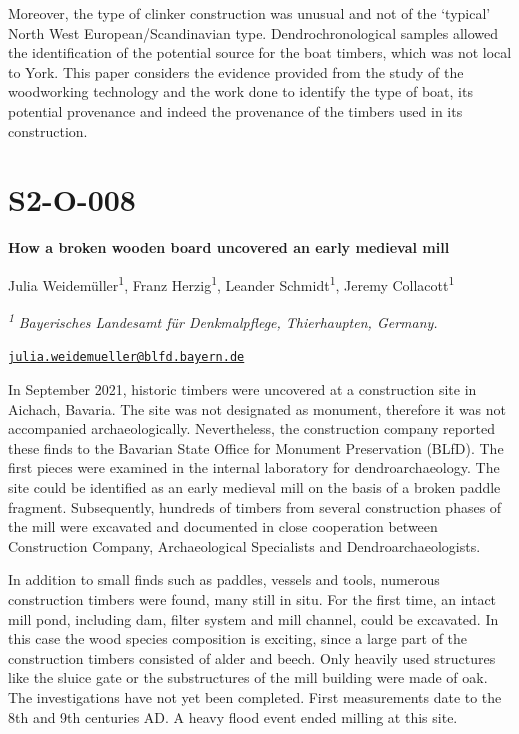 \documentclass[
]{book}
\begin{document}
Moreover, the type of clinker construction was unusual and not of the `typical' North West European/Scandinavian type. Dendrochronological samples allowed the identification of the potential source for the boat timbers, which was not local to York. This paper considers the evidence provided from the study of the woodworking technology and the work done to identify the type of boat, its potential provenance and indeed the provenance of the timbers used in its construction.

\hypertarget{s2-o-008}{%
\section*{S2-O-008}\label{s2-o-008}}

\textbf{How a broken wooden board uncovered an early medieval mill}

Julia Weidemüller\textsuperscript{1}, Franz Herzig\textsuperscript{1}, Leander Schmidt\textsuperscript{1}, Jeremy Collacott\textsuperscript{1}

\textsuperscript{\emph{1}} \emph{Bayerisches Landesamt für Denkmalpflege, Thierhaupten, Germany.}

\href{mailto:julia.weidemueller@blfd.bayern.de}{\nolinkurl{julia.weidemueller@blfd.bayern.de}}

In September 2021, historic timbers were uncovered at a construction site in Aichach, Bavaria. The site was not designated as monument, therefore it was not accompanied archaeologically. Nevertheless, the construction company reported these finds to the Bavarian State Office for Monument Preservation (BLfD). The first pieces were examined in the internal laboratory for dendroarchaeology. The site could be identified as an early medieval mill on the basis of a broken paddle fragment. Subsequently, hundreds of timbers from several construction phases of the mill were excavated and documented in close cooperation between Construction Company, Archaeological Specialists and Dendroarchaeologists.

In addition to small finds such as paddles, vessels and tools, numerous construction timbers were found, many still in situ. For the first time, an intact mill pond, including dam, filter system and mill channel, could be excavated. In this case the wood species composition is exciting, since a large part of the construction timbers consisted of alder and beech. Only heavily used structures like the sluice gate or the substructures of the mill building were made of oak. The investigations have not yet been completed. First measurements date to the 8th and 9th centuries AD. A heavy flood event ended milling at this site.
\end{document}
